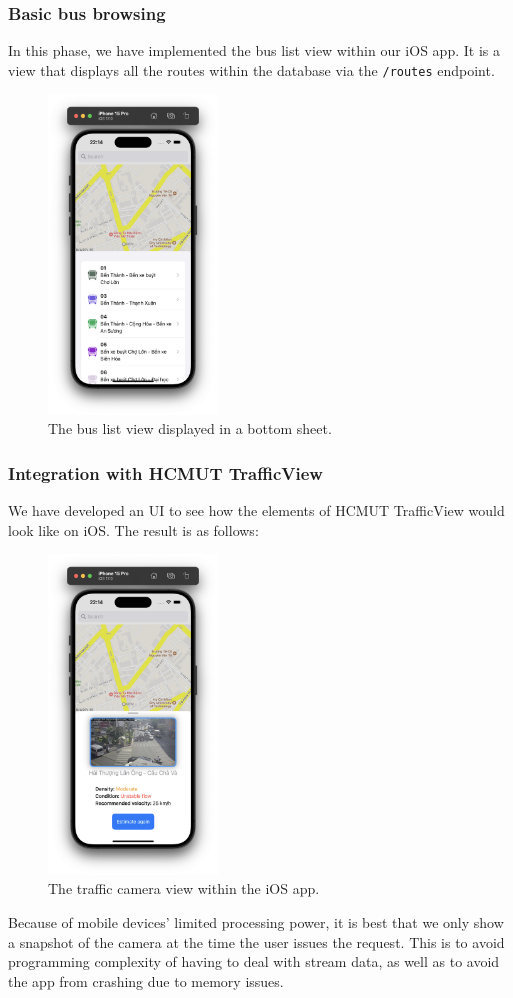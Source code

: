 \subsubsection{Basic bus browsing}
In this phase, we have implemented the bus list view within our iOS app. It is a view that displays all the routes within the database via the \lstinline{/routes} endpoint. 
\begin{figure}
    \centering
    \includegraphics[width=0.4\textwidth]{assets/images/Implementation/bus_view.png}
    \caption{The bus list view displayed in a bottom sheet.}
    \label{fig:bus_view_ios}
\end{figure}

\subsubsection{Integration with HCMUT TrafficView}
We have developed an UI to see how the elements of HCMUT TrafficView would look like on iOS. The result is as follows:

\begin{figure}
    \centering
    \includegraphics[width=0.4\textwidth]{assets/images/Implementation/hcmut_trafficview.png}
    \caption{The traffic camera view within the iOS app.}
    \label{fig:trafficview_ios}
\end{figure}

Because of mobile devices' limited processing power, it is best that we only show a snapshot of the camera at the time the user issues the request. This is to avoid programming complexity of having to deal with stream data, as well as to avoid the app from crashing due to memory issues.


